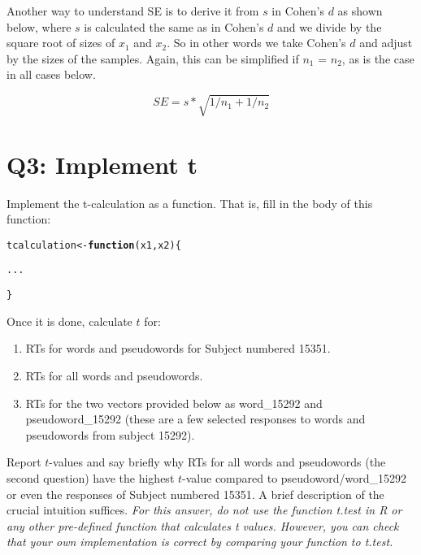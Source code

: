 \documentclass{article}\usepackage[]{graphicx}\usepackage[]{color}
\makeatletter
\newcommand{\hlstd}[1]{\textcolor[rgb]{0.345,0.345,0.345}{#1}}%
\newcommand{\hlkwa}[1]{\textcolor[rgb]{0.161,0.373,0.58}{\textbf{#1}}}%
\newcommand{\hlkwb}[1]{\textcolor[rgb]{0.69,0.353,0.396}{#1}}%
\newcommand{\hlkwc}[1]{\textcolor[rgb]{0.333,0.667,0.333}{#1}}%
\newenvironment{kframe}{%
 \def\at@end@of@kframe{}%
 \ifinner\ifhmode%
  \def\at@end@of@kframe{\end{minipage}}%
  \begin{minipage}{\columnwidth}%
 \fi\fi%
 \def\FrameCommand##1{\hskip\@totalleftmargin \hskip-\fboxsep
 \colorbox{shadecolor}{##1}\hskip-\fboxsep
     \hskip-\linewidth \hskip-\@totalleftmargin \hskip\columnwidth}%
 \MakeFramed {\advance\hsize-\width
   \@totalleftmargin\z@ \linewidth\hsize
   \@setminipage}}%
 {\par\unskip\endMakeFramed%
 \at@end@of@kframe}
\newenvironment{knitrout}{}{} %
\makeatother
\begin{document}
Another way to understand SE is to derive it from $s$ in Cohen's $d$ as shown below, where $s$ is calculated the same as in Cohen's $d$ and we divide by the square root of sizes of $x_1$ and $x_2$. So in other words we take Cohen's $d$ and adjust by the sizes of the samples. Again, this can be simplified if $n_1$ = $n_2$, as is the case in all cases below.

\begin{equation}
    SE=s*\sqrt{1/n_1+1/n_2}
\end{equation}

\section*{Q3: Implement t}

Implement the t-calculation as a function. That is, fill in the body of this function:

\begin{knitrout}
\color{fgcolor}\begin{kframe}
\begin{alltt}
\hlstd{tcalculation} \hlkwb{<-} \hlkwa{function}\hlstd{(}\hlkwc{x1}\hlstd{,} \hlkwc{x2}\hlstd{) \{}

    \hlstd{...}

\hlstd{\}}
\end{alltt}
\end{kframe}
\end{knitrout}

Once it is done, calculate $t$ for:

\begin{enumerate}
    \item RTs for words and pseudowords for Subject numbered 15351.
    \item RTs for all words and pseudowords.
    \item RTs for the two vectors provided below as word\_15292 and pseudoword\_15292 (these are a few selected responses to words and pseudowords from subject 15292).
\end{enumerate}

Report $t$-values and say briefly why RTs for all words and pseudowords (the second question) have the highest $t$-value compared to pseudoword/word\_15292 or even the responses of Subject numbered 15351. A brief description of the crucial intuition suffices. \emph{For this answer, do not use the function t.test in R or any other pre-defined function that calculates t values. However, you can check that your own implementation is correct by comparing your function to t.test.}
\end{document}
